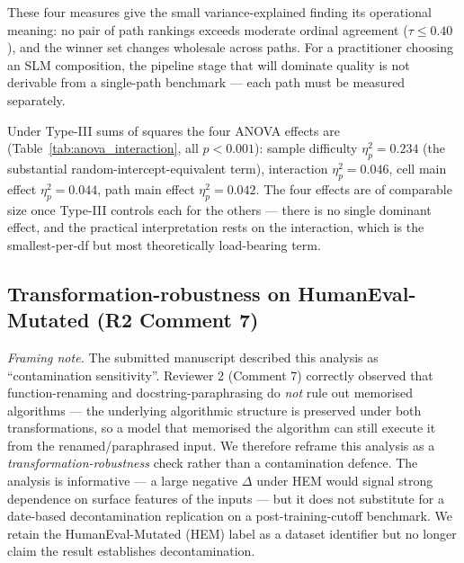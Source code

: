 These four measures give the small variance-explained finding its operational meaning: no pair of path rankings exceeds moderate ordinal agreement ($\tau \leq 0.40$), and the winner set changes wholesale across paths. For a practitioner choosing an SLM composition, the pipeline stage that will dominate quality is not derivable from a single-path benchmark --- each path must be measured separately.

Under Type-III sums of squares the four ANOVA effects are (Table~\ref{tab:anova_interaction}, all $p < 0.001$): sample difficulty $\eta^2_p = 0.234$ (the substantial random-intercept-equivalent term), interaction $\eta^2_p = 0.046$, cell main effect $\eta^2_p = 0.044$, path main effect $\eta^2_p = 0.042$. The four effects are of comparable size once Type-III controls each for the others --- there is no single dominant effect, and the practical interpretation rests on the interaction, which is the smallest-per-df but most theoretically load-bearing term.

\subsection{Transformation-robustness on HumanEval-Mutated (R2 Comment 7)}
\label{sec:results_contamination}



\emph{Framing note.} The submitted manuscript described this analysis as ``contamination sensitivity''. Reviewer 2 (Comment 7) correctly observed that function-renaming and docstring-paraphrasing do \emph{not} rule out memorised algorithms --- the underlying algorithmic structure is preserved under both transformations, so a model that memorised the algorithm can still execute it from the renamed/paraphrased input. We therefore reframe this analysis as a \emph{transformation-robustness} check rather than a contamination defence. The analysis is informative --- a large negative $\Delta$ under HEM would signal strong dependence on surface features of the inputs --- but it does not substitute for a date-based decontamination replication on a post-training-cutoff benchmark. We retain the HumanEval-Mutated (HEM) label as a dataset identifier but no longer claim the result establishes decontamination.

